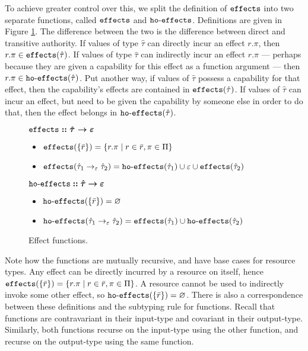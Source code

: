 To achieve greater control over this, we split the definition of $\mathtt{effects}$ into two separate functions, called $\mathtt{effects}$ and $\mathtt{ho \hbox{-} effects}$. Definitions are given in Figure \ref{fig:fx_defns}. The difference between the two is the difference between direct and transitive authority. If values of type $\hat \tau$ can directly incur an effect $r.\pi$, then $r.\pi \in \mathtt{effects}(\hat \tau)$. If values of type $\hat \tau$ can indirectly incur an effect $r.\pi$ --- perhaps because they are given a capability for this effect as a function argument --- then $r.\pi \in \mathtt{ho \hbox{-} effects}(\hat \tau)$. Put another way, if values of $\hat \tau$ possess a capability for that effect, then the capability's effects are contained in $\mathtt{effects}(\hat \tau)$. If values of $\hat \tau$ can incur an effect, but need to be given the capability by someone else in order to do that, then the effect belongs in $\mathtt{ho \hbox{-} effects}(\hat \tau)$.


\begin{figure}[h]

$\bm{\mathtt{effects :: \hat \tau \rightarrow \varepsilon}}$ \begin{itemize}
	\setlength\itemsep{-0.7em}
	\item[] $\mathtt{effects}(\{ \bar r \}) = \{ r.\pi \mid r \in \bar r, \pi \in \Pi \}$
	\item[] $\mathtt{effects}(\hat \tau_1 \rightarrow_{\varepsilon} \hat \tau_2) = \mathtt{ho \hbox{-} effects}(\hat \tau_1) \cup \varepsilon \cup \mathtt{effects}(\hat \tau_2)$
\end{itemize}

$\bm{\mathtt{ho \hbox{-} effects} :: \hat \tau \rightarrow \varepsilon}$ \begin{itemize}
	\setlength\itemsep{-0.7em}
	\item[] $\mathtt{ho \hbox{-} effects}(\{ \bar r \}) = \varnothing$
	\item[] $\mathtt{ho \hbox{-} effects}(\hat \tau_1 \rightarrow_{\varepsilon} \hat \tau_2) = \mathtt{effects}(\hat \tau_1) \cup \mathtt{ho \hbox{-} effects}(\hat \tau_2)$
\end{itemize}

\vspace{-7pt}
\caption{Effect functions.}
\label{fig:fx_defns}
\end{figure}

Note how the functions are mutually recursive, and have base cases for resource types. Any effect can be directly incurred by a resource on itself, hence $\mathtt{effects}(\{ \bar r \}) = \{ r.\pi \mid r \in \bar r, \pi \in \Pi \}$. A resource cannot be used to indirectly invoke some other effect, so $\mathtt{ho \hbox{-} effects}(\{ \bar r \}) = \varnothing$. There is also a correspondence between these definitions and the subtyping rule for functions. Recall that functions are contravariant in their input-type and covariant in their output-type. Similarly, both functions recurse on the input-type using the other function, and recurse on the output-type using the same function.

